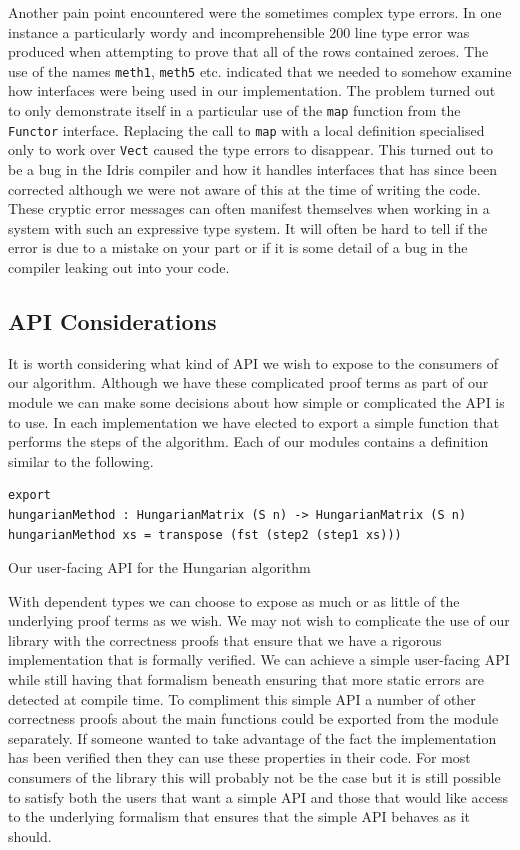 \documentclass[a4paper, notitlepage]{report}
\begin{document}
Another pain point encountered were the sometimes complex type errors. In one
instance a particularly wordy and incomprehensible 200 line type error was
produced when attempting to prove that all of the rows contained zeroes. The use
of the names \texttt{meth1}, \texttt{meth5} etc. indicated that we needed to somehow examine how
interfaces were being used in our implementation. The problem turned out to only
demonstrate itself in a particular use of the \texttt{map} function from the \texttt{Functor}
interface. Replacing the call to \texttt{map} with a local definition specialised only to
work over \texttt{Vect} caused the type errors to disappear. This turned out to be a bug
in the Idris compiler and how it handles interfaces that has since been
corrected although we were not aware of this at the time of writing the code.
These cryptic error messages can often manifest themselves when working in a
system with such an expressive type system. It will often be hard to tell if the
error is due to a mistake on your part or if it is some detail of a bug in the
compiler leaking out into your code.

\subsection{API Considerations}
\label{sec:orgc7a16dc}
It is worth considering what kind of API we wish to expose to the consumers of
our algorithm. Although we have these complicated proof terms as part of our
module we can make some decisions about how simple or complicated the API is to
use. In each implementation we have elected to export a simple function that
performs the steps of the algorithm. Each of our modules contains a definition
similar to the following.

\begin{listing}[H]
\begin{verbatim}
export
hungarianMethod : HungarianMatrix (S n) -> HungarianMatrix (S n)
hungarianMethod xs = transpose (fst (step2 (step1 xs)))
\end{verbatim}
\caption{Our user-facing API for the Hungarian algorithm}
\end{listing}

With dependent types we can choose to expose as much or as little of the
underlying proof terms as we wish. We may not wish to complicate the use of our
library with the correctness proofs that ensure that we have a rigorous
implementation that is formally verified. We can achieve a simple user-facing
API while still having that formalism beneath ensuring that more static errors
are detected at compile time. To compliment this simple API a number of other
correctness proofs about the main functions could be exported from the module
separately. If someone wanted to take advantage of the fact the implementation
has been verified then they can use these properties in their code. For most
consumers of the library this will probably not be the case but it is still
possible to satisfy both the users that want a simple API and those that would
like access to the underlying formalism that ensures that the simple API behaves
as it should.
\end{document}

